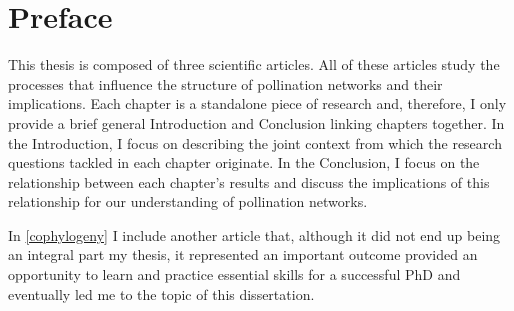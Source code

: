 
{}
\chapter*{Preface}

\manualmark
{}

\noindent This thesis is composed of three scientific articles.
All of these articles study the processes that influence the structure of pollination networks and their implications.
Each chapter is a standalone piece of research and, therefore, I only provide a brief general Introduction and Conclusion linking chapters together.
In the Introduction, I focus on describing the joint context from which the research questions tackled in each chapter originate.
In the Conclusion, I focus on the relationship between each chapter's results and discuss the implications of this relationship for our understanding of pollination networks.

In \autoref{cophylogeny} I include another article that, although it did not end up being an integral part my thesis, it represented an important outcome provided an opportunity to learn and practice essential skills for a successful PhD and eventually led me to the topic of this dissertation.

\vfill
